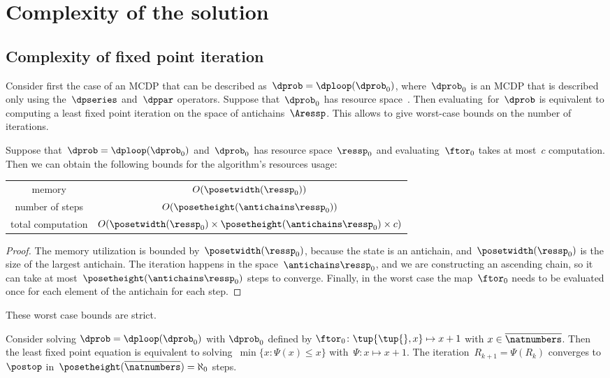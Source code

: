 

\section{Complexity of the solution}

\subsection{Complexity of fixed point iteration}

Consider first the case of an MCDP that can be described as~$\dprob=\dploop(\dprob_{0})$,
where~$\dprob_{0}$ is an MCDP that is described only using the~$\dpseries$
and~$\dppar$ operators. Suppose that~$\dprob_{0}$ has resource
space~\ressp. Then evaluating~\ftor for~$\dprob$ is equivalent
to computing a least fixed point iteration on the space of antichains~$\Aressp$.
This allows to give worst-case bounds on the number of iterations.

\begin{proposition}
  \label{prop:complexity}
  Suppose that~$\dprob=\dploop(\dprob_{0})$ and~$\dprob_{0}$ has resource space~$\ressp_{0}$ and evaluating~$\ftor_{0}$ takes at most~$c$ computation. Then we can obtain the following bounds for the algorithm's resources usage:

  \smallskip{}
  \begin{tabular}{cc}
    memory & $O(\posetwidth(\ressp_{0}))$\tabularnewline
    number of steps & $O(\posetheight(\antichains\ressp_{0}))$\tabularnewline
    total computation & $O(\posetwidth(\ressp_{0})\times\posetheight(\antichains\ressp_{0})\times c)$\tabularnewline
  \end{tabular}

\end{proposition}
\begin{proof}
  The memory utilization is bounded by~$\posetwidth(\ressp_{0})$, because the state is an antichain, and~$\posetwidth(\ressp_{0})$ is the size of the largest antichain. The iteration happens in the space~$\antichains\ressp_{0}$, and we are constructing an ascending chain, so it can take at most~$\posetheight(\antichains\ressp_{0})$ steps to converge. Finally, in the worst case the map~$\ftor_{0}$ needs to be evaluated once for each element of the antichain for each step.
\end{proof}
These worst case bounds are strict.
\begin{example}
  Consider solving $\dprob=\dploop(\dprob_{0})$ with $\dprob_{0}$
  defined by $\ftor_{0}\colon\tup{ \tup{ } ,x} \mapsto x+1$
  with $x\in\overline{\natnumbers}$. Then the least fixed point equation
  is equivalent to solving~$\min\{x\colon\Psi(x)\leq x\}$ with~$\Psi:x\mapsto x+1$.
  The iteration~$R_{k+1}=\Psi(R_{k})$ converges to~$\postop$ in~$\posetheight(\overline{\natnumbers})=\aleph_{0}$
  steps.
\end{example}


